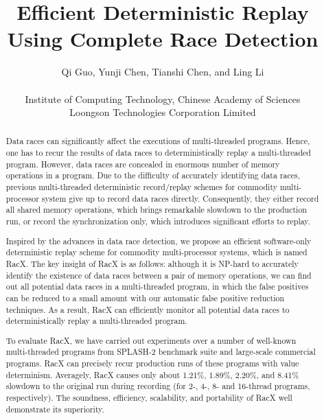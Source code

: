 \documentclass[10pt,onecolumn,letterpaper]{article}
\begin{document}
\title{Efficient Deterministic Replay Using Complete Race Detection}

\date{}
\author{
Qi Guo, Yunji Chen, Tianshi Chen, and Ling Li\\\\
Institute of Computing Technology, Chinese Academy of Sciences\\
Loongson Technologies Corporation Limited}

\maketitle
\begin{abstract}
Data races can significantly affect the executions of multi-threaded
programs. Hence, one has to recur the results of data races to
deterministically replay a multi-threaded program. However, data
races are concealed in enormous number of memory operations in a
program. Due to the difficulty of accurately identifying data races,
previous multi-threaded deterministic record/replay schemes for
commodity multi-processor system give up to record data races
directly. Consequently, they either record all shared memory
operations, which brings remarkable slowdown to the production run,
or record the synchronization only, which introduces significant
efforts to replay.

Inspired by the advances in data race detection, we propose an
efficient software-only deterministic replay scheme for commodity
multi-processor systems, which is named RacX. The key insight of
RacX is as follows: although it is NP-hard to accurately identify
the existence of data races between a pair of memory operations, we
can find out all potential data races in a multi-threaded program,
in which the false positives can be reduced to a small amount with
our automatic false positive reduction techniques. As a result, RacX
can efficiently monitor all potential data races to
deterministically replay a multi-threaded program.

To evaluate RacX, we have carried out experiments over a number of
well-known multi-threaded programs from SPLASH-2 benchmark suite and
large-scale commercial programs. RacX can precisely recur production
runs of these programs with value determinism. Averagely, RacX
causes only about 1.21\%, 1.89\%, 2.20\%, and 8.41\% slowdown to the
original run during recording (for 2-, 4-, 8- and 16-thread
programs, respectively). The soundness, efficiency, scalability, and
portability of RacX well demonstrate its superiority.

\end{abstract}
\end{document}

